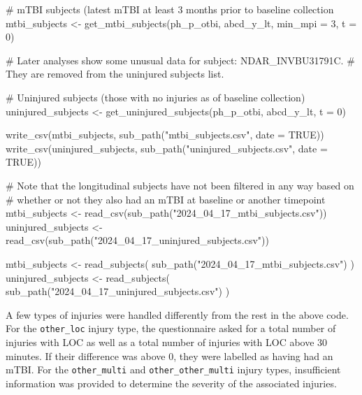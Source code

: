 \documentclass[
  letterpaper,
  DIV=11,
  numbers=noendperiod]{scrreprt}
\newenvironment{Shaded}{\begin{snugshade}}{\end{snugshade}}
\newcommand{\AttributeTok}[1]{\textcolor[rgb]{0.40,0.45,0.13}{#1}}
\newcommand{\CommentTok}[1]{\textcolor[rgb]{0.37,0.37,0.37}{#1}}
\newcommand{\ConstantTok}[1]{\textcolor[rgb]{0.56,0.35,0.01}{#1}}
\newcommand{\DecValTok}[1]{\textcolor[rgb]{0.68,0.00,0.00}{#1}}
\newcommand{\FunctionTok}[1]{\textcolor[rgb]{0.28,0.35,0.67}{#1}}
\newcommand{\NormalTok}[1]{\textcolor[rgb]{0.00,0.23,0.31}{#1}}
\newcommand{\OtherTok}[1]{\textcolor[rgb]{0.00,0.23,0.31}{#1}}
\newcommand{\StringTok}[1]{\textcolor[rgb]{0.13,0.47,0.30}{#1}}
\begin{document}
\begin{Shaded}
\begin{Highlighting}[]
\CommentTok{\# mTBI subjects (latest mTBI at least 3 months prior to baseline collection}
\NormalTok{mtbi\_subjects }\OtherTok{\textless{}{-}} \FunctionTok{get\_mtbi\_subjects}\NormalTok{(ph\_p\_otbi, abcd\_y\_lt, }\AttributeTok{min\_mpi =} \DecValTok{3}\NormalTok{, }\AttributeTok{t =} \DecValTok{0}\NormalTok{)}

\CommentTok{\# Later analyses show some unusual data for subject: NDAR\_INVBU31791C.}
\CommentTok{\# They are removed from the uninjured subjects list.}

\CommentTok{\# Uninjured subjects (those with no injuries as of baseline collection)}
\NormalTok{uninjured\_subjects }\OtherTok{\textless{}{-}} \FunctionTok{get\_uninjured\_subjects}\NormalTok{(ph\_p\_otbi, abcd\_y\_lt, }\AttributeTok{t =} \DecValTok{0}\NormalTok{)}

\FunctionTok{write\_csv}\NormalTok{(mtbi\_subjects, }\FunctionTok{sub\_path}\NormalTok{(}\StringTok{"mtbi\_subjects.csv"}\NormalTok{, }\AttributeTok{date =} \ConstantTok{TRUE}\NormalTok{))}
\FunctionTok{write\_csv}\NormalTok{(uninjured\_subjects, }\FunctionTok{sub\_path}\NormalTok{(}\StringTok{"uninjured\_subjects.csv"}\NormalTok{, }\AttributeTok{date =} \ConstantTok{TRUE}\NormalTok{))}

\CommentTok{\# Note that the longitudinal subjects have not been filtered in any way based on}
\CommentTok{\#  whether or not they also had an mTBI at baseline or another timepoint}
\NormalTok{mtbi\_subjects }\OtherTok{\textless{}{-}} \FunctionTok{read\_csv}\NormalTok{(}\FunctionTok{sub\_path}\NormalTok{(}\StringTok{"2024\_04\_17\_mtbi\_subjects.csv"}\NormalTok{))}
\NormalTok{uninjured\_subjects }\OtherTok{\textless{}{-}} \FunctionTok{read\_csv}\NormalTok{(}\FunctionTok{sub\_path}\NormalTok{(}\StringTok{"2024\_04\_17\_uninjured\_subjects.csv"}\NormalTok{))}

\NormalTok{mtbi\_subjects }\OtherTok{\textless{}{-}} \FunctionTok{read\_subjects}\NormalTok{(}
    \FunctionTok{sub\_path}\NormalTok{(}\StringTok{"2024\_04\_17\_mtbi\_subjects.csv"}\NormalTok{)}
\NormalTok{)}
\NormalTok{uninjured\_subjects }\OtherTok{\textless{}{-}} \FunctionTok{read\_subjects}\NormalTok{(}
    \FunctionTok{sub\_path}\NormalTok{(}\StringTok{"2024\_04\_17\_uninjured\_subjects.csv"}\NormalTok{)}
\NormalTok{)}
\end{Highlighting}
\end{Shaded}

A few types of injuries were handled differently from the rest in the
above code. For the \texttt{other\_loc} injury type, the questionnaire
asked for a total number of injuries with LOC as well as a total number
of injuries with LOC above 30 minutes. If their difference was above 0,
they were labelled as having had an mTBI. For the \texttt{other\_multi}
and \texttt{other\_other\_multi} injury types, insufficient information
was provided to determine the severity of the associated injuries.
\end{document}
